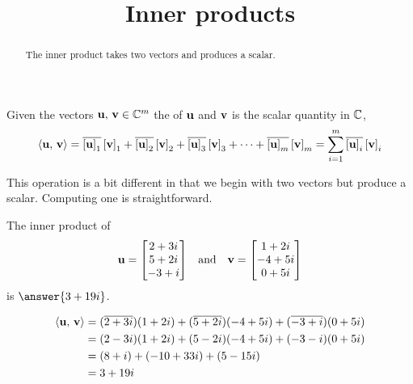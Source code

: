 \documentclass{ximera}
\title{Inner products}
\begin{document}
\begin{abstract}
  The inner product takes two vectors and produces a scalar.
\end{abstract}
\maketitle

\begin{definition}
Given the vectors $\mathbf{u},\,\mathbf{v}\in\mathbb{C}^{m}$ the  of $\mathbf{u}$ and $\mathbf{v}$ is the scalar quantity in $\mathbb{C}$,
\[
\left\langle\mathbf{u},\,\mathbf{v}\right\rangle=
\overline{\left\lbrack\mathbf{u}\right\rbrack_{1}}\left\lbrack\mathbf{v}\right\rbrack_{1}+
\overline{\left\lbrack\mathbf{u}\right\rbrack_{2}}\left\lbrack\mathbf{v}\right\rbrack_{2}+
\overline{\left\lbrack\mathbf{u}\right\rbrack_{3}}\left\lbrack\mathbf{v}\right\rbrack_{3}+
\cdots+
\overline{\left\lbrack\mathbf{u}\right\rbrack_{m}}\left\lbrack\mathbf{v}\right\rbrack_{m}
=
\sum_{i=1}^{m}\overline{\left\lbrack\mathbf{u}\right\rbrack_{i}}\left\lbrack\mathbf{v}\right\rbrack_{i}
\]
\end{definition}

This operation is a bit different in that we begin with two vectors but produce a scalar.  Computing one is straightforward.

\begin{example}
  The inner product of
  \begin{align*}
    \mathbf{u}=\begin{bmatrix}2+3i\\5+2i\\-3+i\end{bmatrix}&&\text{and}&&
                                                        \mathbf{v}=\begin{bmatrix}1+2i\\-4+5i\\0+5i\end{bmatrix}
  \end{align*}
  is $\answer{3+19i}$.
  
  \begin{hint}
    \begin{align*}
      \left\langle\mathbf{u},\,\mathbf{v}\right\rangle
      &=(\overline{2+3i})(1+2i)+(\overline{5+2i})(-4+5i)+(\overline{-3+i})(0+5i)\\
      &=(2-3i)(1+2i)+(5-2i)(-4+5i)+(-3-i)(0+5i)\\
      &=(8+i)+(-10+33i)+(5-15i)\\
      &=3+19i
    \end{align*}
  \end{hint}
\end{example}
\end{document}
